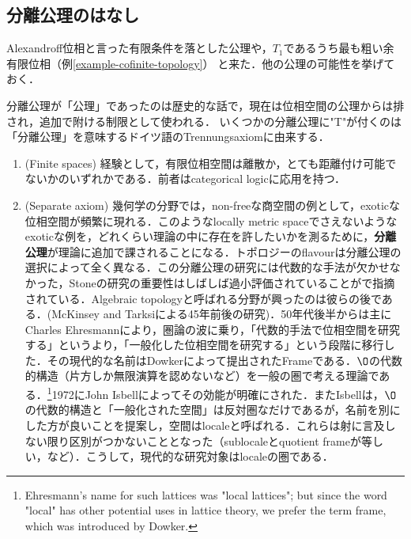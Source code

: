 \documentclass[uplatex,dvipdfmx]{jsreport}
\begin{document}
\subsection{分離公理のはなし}

\begin{tcolorbox}[colframe=ForestGreen, colback=ForestGreen!10!white, breakable]
    Alexandroff位相と言った有限条件を落とした公理や，$T_1$であるうち最も粗い余有限位相（例\ref{example-cofinite-topology}）
    と来た．他の公理の可能性を挙げておく．
\end{tcolorbox}

\begin{remark}[Tikhonovの分離公理のはなし]
    分離公理が「公理」であったのは歴史的な話で，現在は位相空間の公理からは排され，追加で附ける制限として使われる．
    いくつかの分離公理に"T"が付くのは「分離公理」を意味するドイツ語のTrennungsaxiomに由来する．
    \begin{enumerate}
        \item (Finite spaces) 経験として，有限位相空間は離散か，とても距離付け可能でないかのいずれかである．前者はcategorical logicに応用を持つ．
        \item (Separate axiom) 幾何学の分野では，non-freeな商空間の例として，exoticな位相空間が頻繁に現れる．このようなlocally metric spaceでさえないようなexoticな例を，どれくらい理論の中に存在を許したいかを測るために，\textbf{分離公理}が理論に追加で課されることになる．トポロジーのflavourは分離公理の選択によって全く異なる．この分離公理の研究には代数的な手法が欠かせなかった，Stoneの研究の重要性はしばしば過小評価されていることが\cite{Johnstone}で指摘されている．Algebraic topologyと呼ばれる分野が興ったのは彼らの後である．(McKinsey and Tarksiによる45年前後の研究)．50年代後半からは主にCharles Ehresmannにより，圏論の波に乗り，「代数的手法で位相空間を研究する」というより，「一般化した位相空間を研究する」という段階に移行した．その現代的な名前はDowkerによって提出されたFrameである．$\O$の代数的構造（片方しか無限演算を認めないなど）を一般の圏で考える理論である．\footnote{Ehresmann's name for such lattices was "local lattices"; but since the word "local" has other potential uses in lattice theory, we prefer the term frame, which was introduced by Dowker.\cite{Johnstone}}1972にJohn Isbellによってその効能が明確にされた．またIsbellは，$\O$の代数的構造と「一般化された空間」は反対圏なだけであるが，名前を別にした方が良いことを提案し，空間はlocaleと呼ばれる．これらは射に言及しない限り区別がつかないこととなった（sublocaleとquotient frameが等しい，など）．こうして，現代的な研究対象はlocaleの圏である．

\end{enumerate}
\end{remark}
\end{document}
